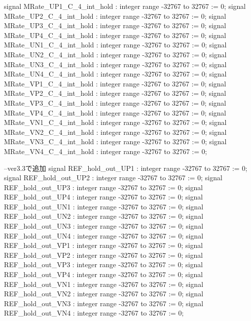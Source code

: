 \begin{mylisting}[language=VHDL,caption=ゲート信号出力モジュール,label=MMC_PWM_GEN_module_VHDL]
	signal 	MRate_UP1_C_4_int_hold			: integer range -32767 to 32767		:= 0;
	signal 	MRate_UP2_C_4_int_hold			: integer range -32767 to 32767		:= 0;
	signal 	MRate_UP3_C_4_int_hold			: integer range -32767 to 32767		:= 0;
	signal 	MRate_UP4_C_4_int_hold			: integer range -32767 to 32767		:= 0;
	signal 	MRate_UN1_C_4_int_hold			: integer range -32767 to 32767		:= 0;
	signal 	MRate_UN2_C_4_int_hold			: integer range -32767 to 32767		:= 0;
	signal 	MRate_UN3_C_4_int_hold			: integer range -32767 to 32767		:= 0;
	signal 	MRate_UN4_C_4_int_hold			: integer range -32767 to 32767		:= 0;
	signal 	MRate_VP1_C_4_int_hold			: integer range -32767 to 32767		:= 0;
	signal 	MRate_VP2_C_4_int_hold			: integer range -32767 to 32767		:= 0;
	signal 	MRate_VP3_C_4_int_hold			: integer range -32767 to 32767		:= 0;
	signal 	MRate_VP4_C_4_int_hold			: integer range -32767 to 32767		:= 0;
	signal 	MRate_VN1_C_4_int_hold			: integer range -32767 to 32767		:= 0;
	signal 	MRate_VN2_C_4_int_hold			: integer range -32767 to 32767		:= 0;
	signal 	MRate_VN3_C_4_int_hold			: integer range -32767 to 32767		:= 0;
	signal 	MRate_VN4_C_4_int_hold			: integer range -32767 to 32767		:= 0;
	
	--ver3.3で追加
	signal 	REF_hold_out_UP1			: integer range -32767 to 32767		:= 0;
	signal 	REF_hold_out_UP2			: integer range -32767 to 32767		:= 0;
	signal 	REF_hold_out_UP3			: integer range -32767 to 32767		:= 0;
	signal 	REF_hold_out_UP4			: integer range -32767 to 32767		:= 0;
	signal 	REF_hold_out_UN1			: integer range -32767 to 32767		:= 0;
	signal 	REF_hold_out_UN2			: integer range -32767 to 32767		:= 0;
	signal 	REF_hold_out_UN3			: integer range -32767 to 32767		:= 0;
	signal 	REF_hold_out_UN4			: integer range -32767 to 32767		:= 0;
	signal 	REF_hold_out_VP1			: integer range -32767 to 32767		:= 0;
	signal 	REF_hold_out_VP2			: integer range -32767 to 32767		:= 0;
	signal 	REF_hold_out_VP3			: integer range -32767 to 32767		:= 0;
	signal 	REF_hold_out_VP4			: integer range -32767 to 32767		:= 0;
	signal 	REF_hold_out_VN1			: integer range -32767 to 32767		:= 0;
	signal 	REF_hold_out_VN2			: integer range -32767 to 32767		:= 0;
	signal 	REF_hold_out_VN3			: integer range -32767 to 32767		:= 0;
	signal 	REF_hold_out_VN4			: integer range -32767 to 32767		:= 0;
	

\end{mylisting}
